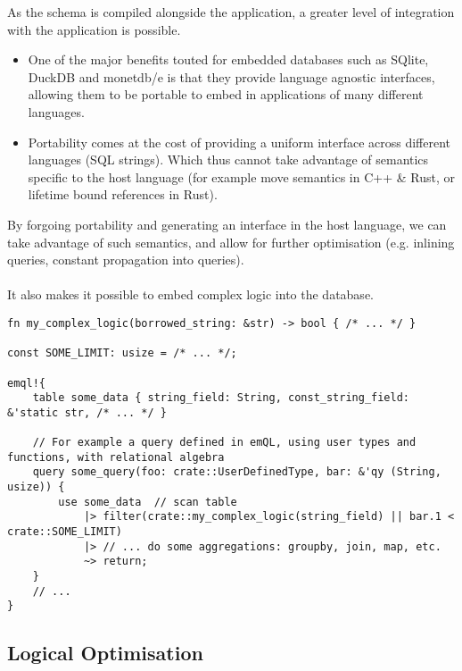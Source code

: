 As the schema is compiled alongside the application, a greater level of integration with the application is possible.
\begin{itemize}
    \setlength\itemsep{0em}
    \item One of the major benefits touted for embedded databases such as SQlite, DuckDB and monetdb/e is that they provide language
          agnostic interfaces, allowing them to be portable to embed in applications of many different languages.
    \item Portability comes at the cost of providing a uniform interface across different languages (SQL strings). Which thus cannot take advantage of semantics specific to the host language (for example move semantics in C++ \& Rust, or lifetime bound references in Rust).
\end{itemize}
By forgoing portability and generating an interface in the host language, we can take advantage of such semantics, 
and allow for further optimisation (e.g. inlining queries, constant propagation into queries).
\\
\\ It also makes it possible to embed complex logic into the database.
\begin{verbatim}
fn my_complex_logic(borrowed_string: &str) -> bool { /* ... */ }

const SOME_LIMIT: usize = /* ... */;

emql!{
    table some_data { string_field: String, const_string_field: &'static str, /* ... */ }

    // For example a query defined in emQL, using user types and functions, with relational algebra
    query some_query(foo: crate::UserDefinedType, bar: &'qy (String, usize)) {
        use some_data  // scan table
            |> filter(crate::my_complex_logic(string_field) || bar.1 < crate::SOME_LIMIT)
            |> // ... do some aggregations: groupby, join, map, etc.
            ~> return;
    }
    // ...
}
\end{verbatim}

\subsection{Logical Optimisation}

